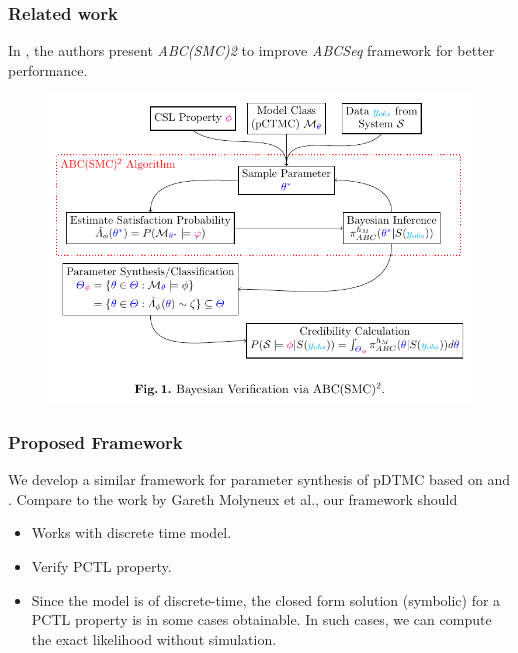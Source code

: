 \documentclass{beamer}
\begin{document}
\begin{frame}
  \frametitle{Related work}
  In \cite{molyneux2020abc}, the authors present \textit{ABC(SMC)2} to
  improve \textit{ABCSeq} framework for better performance.
  \begin{figure}[t]
    \includegraphics[height=0.7\textheight]{molyneux2020.png} \centering
  \end{figure}
\end{frame}

\begin{frame}
  \frametitle{Proposed Framework}
  We develop a similar framework for parameter synthesis of pDTMC based on
  \cite{molyneux2020abc} and \cite{molyneux2019bayesian}. Compare to the work by
  Gareth Molyneux et al., our framework should
  \begin{itemize}
  \item Works with discrete time model.
  \item Verify PCTL property.
  \item Since the model is of discrete-time, the closed form solution (symbolic)
    for a PCTL property is in some cases obtainable. In such cases, we can
    compute the exact likelihood without simulation.
  \end{itemize}
\end{frame}
\end{document}
